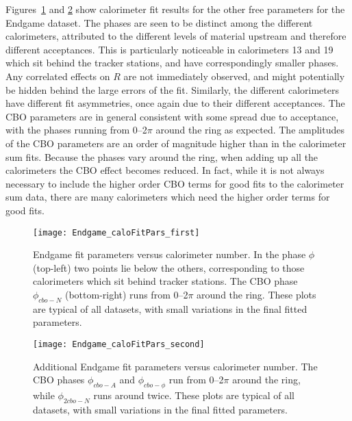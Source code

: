 Figures~\ref{fig:caloFits_EndgamePars_1} and \ref{fig:fig:caloFits_EndgamePars_2} show calorimeter fit results for the other free parameters for the Endgame dataset. The \gmtwo phases are seen to be distinct among the different calorimeters, attributed to the different levels of material upstream and therefore different acceptances. This is particularly noticeable in calorimeters 13 and 19 which sit behind the tracker stations, and have correspondingly smaller phases. Any correlated effects on $R$ are not immediately observed, and might potentially be hidden behind the large errors of the fit. Similarly, the different calorimeters have different fit asymmetries, once again due to their different acceptances. The CBO parameters are in general consistent with some spread due to acceptance, with the phases running from 0--2$\pi$ around the ring as expected. The amplitudes of the CBO parameters are an order of magnitude higher than in the calorimeter sum fits. Because the phases vary around the ring, when adding up all the calorimeters the CBO effect becomes reduced. In fact, while it is not always necessary to include the higher order CBO terms for good fits to the calorimeter sum data, there are many calorimeters which need the higher order terms for good fits.


\begin{figure}
\centering
\texttt{[image: Endgame\_caloFitPars\_first]}
\caption[Endgame fit parameters versus calorimeter number]{Endgame fit parameters versus calorimeter number. In the  \gmtwo phase $\phi$ (top-left) two points lie below the others, corresponding to those calorimeters which sit behind tracker stations. The CBO phase $\phi_{cbo-N}$ (bottom-right) runs from 0--2$\pi$ around the ring. These plots are typical of all datasets, with small variations in the final fitted parameters.}
\label{fig:caloFits_EndgamePars_1}
\end{figure}


\begin{figure}[t]
\centering
\texttt{[image: Endgame\_caloFitPars\_second]}
\caption[Additional Endgame fit parameters versus calorimeter number]{Additional Endgame fit parameters versus calorimeter number. The CBO phases $\phi_{cbo-A}$ and $\phi_{cbo-\phi}$ run from 0--2$\pi$ around the ring, while $\phi_{2cbo-N}$ runs around twice. These plots are typical of all datasets, with small variations in the final fitted parameters.}
\label{fig:fig:caloFits_EndgamePars_2}
\end{figure}


